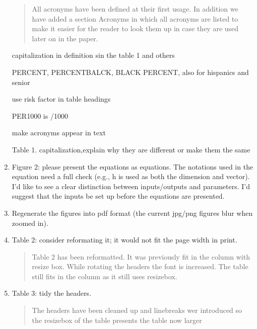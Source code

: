 \begin{enumerate}
\begin{quote}
    All acronyms have been defined at their first usage. In addition we have added a section Acronyms in which all acronyms are listed to make it easier for the reader to look them up in case they are used later on in the paper.
\end{quote}

\DOIT capitalization in definition sin the table 1 and others

\DOIT PERCENT, PERCENTBALCK, BLACK PERCENT, also for hispanics and senior

\DOIT use risk factor in table headings

\DOIT PER1000 is /1000

\DOIT make acronyms appear in text

\DOIT Table 1. capitalization,explain why they are different or make them the same


\item \DOIT  Figure 2: please present the equations as equations. The notations used in the equation need a full check (e.g., h is used as both the dimension and vector). I'd like to see a clear distinction between inputs/outputs and parameters. I'd suggest that the inputs be set up before the equations are presented.

\begin{quote}
\end{quote}

\item \DOIT  Regenerate the figures into pdf format (the current jpg/png figures blur when zoomed in).

\begin{quote}
\end{quote}

\item \DONE  Table 2: consider reformating it; it would not fit the page width in print.

\begin{quote}
Table 2 has been reformatted. It was previously fit in the column with resize box. While rotating the headers the font is increased. The table still fits in the column as it still uses resizebox.
\end{quote}


\item \DONE  Table 3: tidy the headers.

\begin{quote}
    The headers have been cleaned up and linebreaks wer introduced so the resizebox of the table presents the table now larger
\end{quote}


\end{enumerate}
